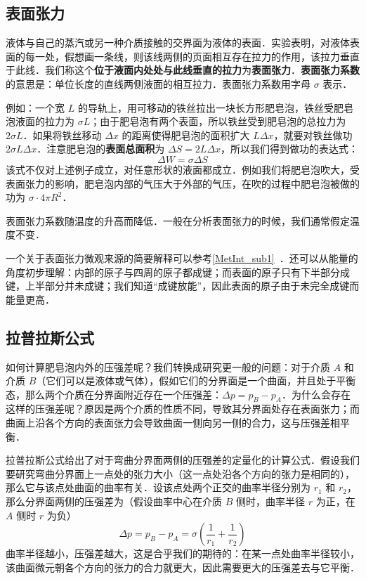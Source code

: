 

\subsection{表面张力}

液体与自己的蒸汽或另一种介质接触的交界面为液体的表面．实验表明，对液体表面的每一处，假想画一条线，则该线两侧的页面相互存在拉力的作用，该拉力垂直于此线．我们称这个\textbf{位于液面内处处与此线垂直的拉力}为\textbf{表面张力}．\textbf{表面张力系数} 的意思是：单位长度的直线两侧液面的相互拉力．表面张力系数用字母 $\sigma$ 表示．

例如：一个宽 $L$ 的导轨上，用可移动的铁丝拉出一块长方形肥皂泡，铁丝受肥皂泡液面的拉力为 $\sigma L$；由于肥皂泡有两个表面，所以铁丝受到肥皂泡的总拉力为 $2\sigma L$．如果将铁丝移动 $\Delta x$ 的距离使得肥皂泡的面积扩大 $L\Delta x$，就要对铁丝做功 $2\sigma L\Delta x$．注意肥皂泡的\textbf{表面总面积}为 $\Delta S=2 L \Delta x$，所以我们得到做功的表达式：
\begin{equation}
\Delta W=\sigma \Delta S
\end{equation}
该式不仅对上述例子成立，对任意形状的液面都成立．例如我们将肥皂泡吹大，受表面张力的影响，肥皂泡内部的气压大于外部的气压，在吹的过程中肥皂泡被做的功为 $\sigma\cdot 4\pi R^2$．

表面张力系数随温度的升高而降低．一般在分析表面张力的时候，我们通常假定温度不变．

一个关于表面张力微观来源的简要解释可以参考\autoref{MetInt_sub1}~．还可以从能量的角度初步理解：内部的原子与四周的原子都成键；而表面的原子只有下半部分成键，上半部分并未成键；我们知道“成键放能”，因此表面的原子由于未完全成键而能量更高．

\subsection{拉普拉斯公式}
如何计算肥皂泡内外的压强差呢？我们转换成研究更一般的问题：对于介质 $A$ 和介质 $B$（它们可以是液体或气体），假如它们的分界面是一个曲面，并且处于平衡态，那么两个介质在分界面附近存在一个压强差：$\Delta p=p_B-p_A$．为什么会存在这样的压强差呢？原因是两个介质的性质不同，导致其分界面处存在表面张力；而曲面上沿各个方向的表面张力会导致曲面一侧向另一侧的合力，这与压强差相平衡．

拉普拉斯公式给出了对于弯曲分界面两侧的压强差的定量化的计算公式．假设我们要研究弯曲分界面上一点处的张力大小（这一点处沿各个方向的张力是相同的），那么它与该点处曲面的曲率有关．设该点处两个正交的曲率半径分别为 $r_1$ 和 $r_2$，那么分界面两侧的压强差为（假设曲率中心在介质 $B$ 侧时，曲率半径 $r$ 为正，在 $A$ 侧时 $r$ 为负）
\begin{equation}
\Delta p=p_B-p_A=\sigma(\frac{1}{r_1}+\frac{1}{r_2})
\end{equation}
曲率半径越小，压强差越大，这是合乎我们的期待的：在某一点处曲率半径较小，该曲面微元朝各个方向的张力的合力就更大，因此需要更大的压强差去与它平衡．

